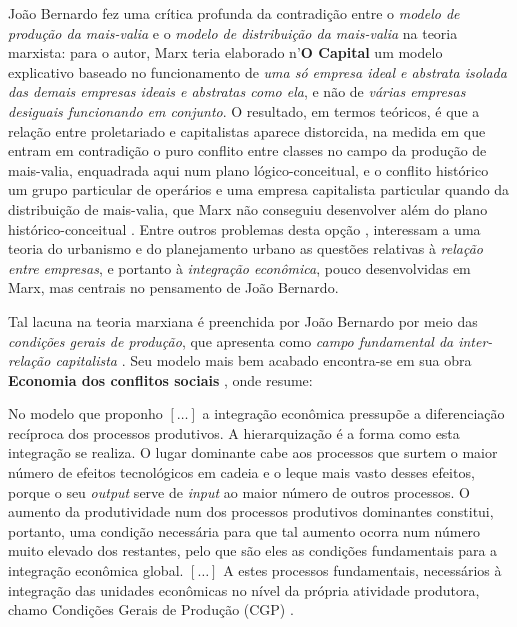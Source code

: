 João Bernardo fez uma crítica profunda da contradição entre o \textit{modelo de produção da mais-valia} e o \textit{modelo de distribuição da mais-valia} na teoria marxista: para o autor, Marx teria elaborado n'\textbf{O Capital} um modelo explicativo baseado no funcionamento de \textit{uma só empresa ideal e abstrata isolada das demais empresas ideais e abstratas como ela}, e não de \textit{várias empresas desiguais funcionando em conjunto}. O resultado, em termos teóricos, é que a relação entre proletariado e capitalistas aparece distorcida, na medida em que entram em contradição o puro conflito entre classes no campo da produção de mais-valia, enquadrada aqui num plano lógico-conceitual, e o conflito histórico um grupo particular de operários e uma empresa capitalista particular quando da distribuição de mais-valia, que Marx não conseguiu desenvolver além do plano histórico-conceitual \cite[p.~10-11]{BERNARDO1977b}. Entre outros problemas desta opção \cite[p.~7-21]{BERNARDO1977b}, interessam a uma teoria do urbanismo e do planejamento urbano as questões relativas à \textit{relação entre empresas}, e portanto à \textit{integração econômica}, pouco desenvolvidas em Marx, mas centrais no pensamento de João Bernardo.

Tal lacuna na teoria marxiana é preenchida por João Bernardo por meio das \textit{condições gerais de produção}, que apresenta como \textit{campo fundamental da inter-relação capitalista} \cite[p.~110-115]{BERNARDO1977b}. Seu modelo mais bem acabado encontra-se em sua obra \textbf{Economia dos conflitos sociais} \cite{BERNARDO1991}, onde resume:

\begin{citacao}
No modelo que proponho \([\dots]\) a integração econômica pressupõe a diferenciação recíproca dos processos produtivos. A hierarquização é a forma como esta integração se realiza. O lugar dominante cabe aos processos que surtem o maior número de efeitos tecnológicos em cadeia e o leque mais vasto desses efeitos, porque o seu \textit{output} serve de \textit{input} ao maior número de outros processos. O aumento da produtividade num dos processos produtivos dominantes constitui, portanto, uma condição necessária para que tal aumento ocorra num número muito elevado dos restantes, pelo que são eles as condições fundamentais para a integração econômica global. \([\dots]\) A estes processos fundamentais, necessários à integração das unidades econômicas no nível da própria atividade produtora, chamo Condições Gerais de Produção (CGP) \cite[p.~157-158]{BERNARDO1991}.
\end{citacao}

